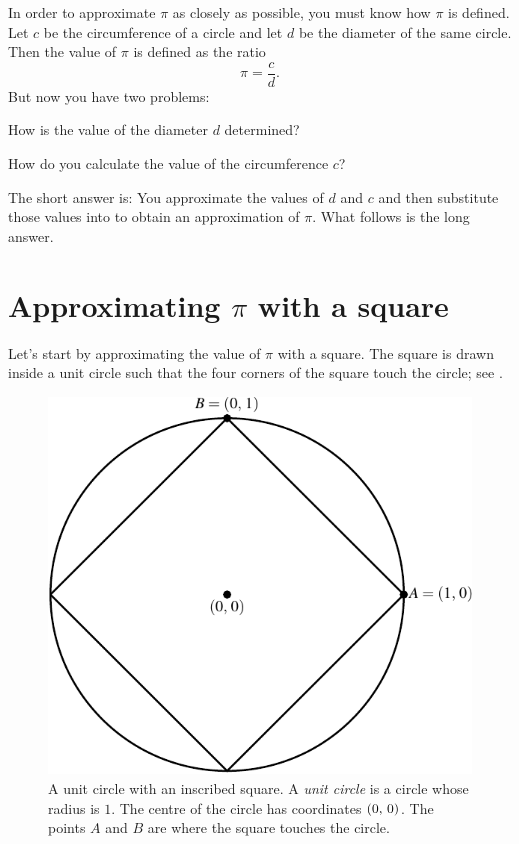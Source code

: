 \documentclass[a4paper,oneside,12pt]{article}
\begin{document}
In order to approximate $\pi$ as closely as possible, you must know
how $\pi$ is defined.  Let $c$ be the circumference of a circle and
let $d$ be the diameter of the same circle.  Then the value of $\pi$
is defined as the ratio
\begin{equation}
\label{eqn:define_pi_as_ratio_of_c_over_d}
\pi
=
\frac{c}{d}.
\end{equation}
But now you have two problems:
\begin{packedenumeral}
\item How is the value of the diameter $d$ determined?

\item How do you calculate the value of the circumference $c$?
\end{packedenumeral}
The short answer is: You approximate the values of $d$ and $c$ and
then substitute those values into
 to obtain an
approximation of $\pi$.  What follows is the long answer.



\section{Approximating $\pi$ with a square}

Let's start by approximating the value of $\pi$ with a square.  The
square is drawn inside a unit circle such that the four corners of the
square touch the circle; see .

\begin{figure}[!htbp]
\centering
\includegraphics[scale=1]{image/03/circle-square.pdf}
\caption{%
  A unit circle with an inscribed square.  A \emph{unit circle} is a
  circle whose radius is $1$.  The centre of the circle has
  coordinates $\left\lparen{0},\, {0}\right\rparen$.  The points $A$ and $B$ are where the
  square touches the circle.
}
\label{fig:circle_inscribed_square}
\end{figure}
\end{document}
